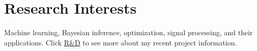 \documentclass[a4paper,10pt]{article}
\begin{document}
\section{Research Interests}
Machine learning, Bayesian inference, optimization, signal processing, and their applications. Click \href{https://firsthandscientist.github.io/#/research}{R\&D} to see more about my recent project information.

\begin{bibunit}
  \renewcommand\refname{Recent Publications (See more at \href{https://scholar.google.com/citations?user=eK9LoQMAAAAJ&hl=en}{my Scholar})}
  \nocite{
    liu2020region,
    liu2020alpha,
    zuxing2020cdc,
    anubhad2020,
    andrea2020,
    liu2020powering,
    honore2020hidden,
    liu2020neural,
    chatterjee2019ssfn,
    liu2019discontinuous,
    liu2019entropy,
    liu2019alpha,
    liu2019dominant,
    liu2018will}

  \footnotesize{\putbib[../bibfile]}
\end{bibunit}

\end{document}
